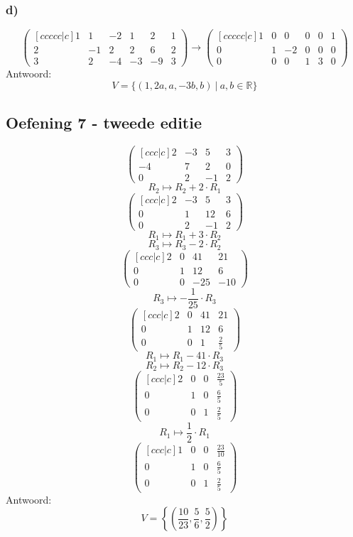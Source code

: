 \documentclass[lineaire_algebra_oplossingen.tex]{subfiles}
\begin{document}
\subsubsection*{d)}
\[
\begin{pmatrix}[ccccc|c]
1 &  1 & -2 &  1 &  2 & 1\\
2 & -1 &  2 &  2 &  6 & 2\\
3 &  2 & -4 & -3 & -9 & 3
\end{pmatrix}
\longrightarrow
\begin{pmatrix}[ccccc|c]
1 &  0 &  0 &  0 &  0 & 1\\
0 &  1 & -2 &  0 &  0 & 0\\
0 &  0 &  0 &  1 &  3 & 0
\end{pmatrix}
\]
Antwoord:
\[
V=\{(1,2a,a,-3b,b)\ |\ a,b \in \mathbb{R} \}
\]

\subsection{Oefening 7 - tweede editie}
\[
\begin{pmatrix}[ccc|c]
2 & -3 & 5 & 3\\
-4 & 7 & 2 & 0\\
0 & 2 & -1 & 2
\end{pmatrix}
\]
\[ R_2 \longmapsto R_2 + 2\cdot R_1\]
\[
\begin{pmatrix}[ccc|c]
2 & -3 & 5 & 3\\
0 & 1 & 12 & 6\\
0 & 2 & -1 & 2
\end{pmatrix}
\]
\[ R_1 \longmapsto R_1 + 3\cdot R_2\]
\[ R_3 \longmapsto R_3 - 2\cdot R_2\]
\[
\begin{pmatrix}[ccc|c]
2 & 0 & 41 & 21\\
0 & 1 & 12 & 6\\
0 & 0 & -25 & -10
\end{pmatrix}
\]
\[ R_3 \longmapsto -\frac{1}{25}\cdot R_3\]
\[
\begin{pmatrix}[ccc|c]
2 & 0 & 41 & 21\\
0 & 1 & 12 & 6\\
0 & 0 & 1 & \frac{2}{5}
\end{pmatrix}
\]
\[ R_1 \longmapsto R_1 - 41\cdot R_3\]
\[ R_2 \longmapsto R_2 - 12\cdot R_3\]
\[
\begin{pmatrix}[ccc|c]
2 & 0 & 0 & \frac{23}{5}\\
0 & 1 & 0 & \frac{6}{5}\\
0 & 0 & 1 & \frac{2}{5}
\end{pmatrix}
\]
\[ R_1 \longmapsto \frac{1}{2}\cdot R_1\]
\[\begin{pmatrix}[ccc|c]
1 & 0 & 0 & \frac{23}{10}\\
0 & 1 & 0 & \frac{6}{5}\\
0 & 0 & 1 & \frac{2}{5}
\end{pmatrix}
\]
Antwoord:
\[
V = \left\{\left( \frac{10}{23},\frac{5}{6},\frac{5}{2} \right)\right\}
\]
\end{document}
